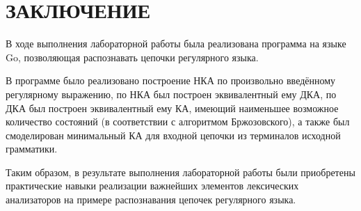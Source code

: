 \chapter*{ЗАКЛЮЧЕНИЕ}

В ходе выполнения лабораторной работы была реализована программа
на языке Go, позволяющая распознавать цепочки регулярного языка.


В программе было реализовано построение НКА по произвольно
введённому регулярному выражению, по НКА был построен эквивалентный
ему ДКА, по ДКА был построен эквивалентный ему КА, имеющий
наименьшее возможное количество состояний (в соответствии с алгоритмом
Бржозовского), а также был смоделирован минимальный КА для входной
цепочки из терминалов исходной грамматики.


Таким образом, в результате выполнения лабораторной работы были
приобретены практические навыки реализации важнейших элементов
лексических анализаторов на примере распознавания цепочек регулярного
языка.